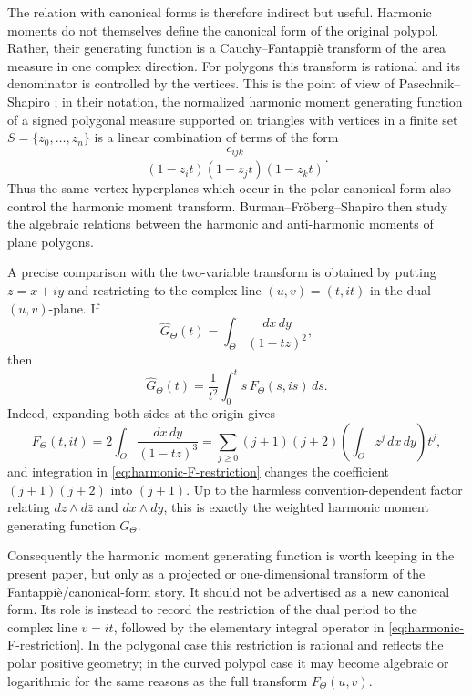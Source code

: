 \documentclass[10pt,a4paper,reqno]{amsart}
\theoremstyle{plain}
\theoremstyle{definition}
\begin{document}
The relation with canonical forms is therefore indirect but useful.  Harmonic
moments do not themselves define the canonical form of the original polypol.
Rather, their generating function is a Cauchy--Fantappi\`e transform of the area
measure in one complex direction.  For polygons this transform is rational and
its denominator is controlled by the vertices.  This is the point of view of
Pasechnik--Shapiro \cite{PaSh}; in their notation, the normalized harmonic
moment generating function of a signed polygonal measure supported on triangles
with vertices in a finite set $S=\{z_0,\ldots,z_n\}$ is a linear combination of
terms of the form
\[
        \frac{c_{ijk}}{(1-z_i t)(1-z_jt)(1-z_kt)}.
\]
Thus the same vertex hyperplanes which occur in the polar canonical form also
control the harmonic moment transform.  Burman--Fr\"oberg--Shapiro
\cite{BuFrSh} then study the algebraic relations between the harmonic and
anti-harmonic moments of plane polygons.

A precise comparison with the two-variable transform is obtained by putting
$z=x+iy$ and restricting to the complex line $(u,v)=(t,it)$ in the dual
$(u,v)$-plane.  If
\[
        \widehat G_\Theta(t)=\int_\Theta\frac{dx\,dy}{(1-tz)^2},
\]
then
\begin{equation}\label{eq:harmonic-F-restriction}
        \widehat G_\Theta(t)=
        \frac{1}{t^2}\int_0^t s\,F_\Theta(s,is)\,ds .
\end{equation}
Indeed, expanding both sides at the origin gives
\[
        F_\Theta(t,it)
        =2\int_\Theta\frac{dx\,dy}{(1-tz)^3}
        =\sum_{j\geq0}(j+1)(j+2)
          \left(\int_\Theta z^j\,dx\,dy\right)t^j,
\]
and integration in \eqref{eq:harmonic-F-restriction} changes the coefficient
$(j+1)(j+2)$ into $(j+1)$.  Up to the harmless convention-dependent factor
relating $dz\wedge d\bar z$ and $dx\wedge dy$, this is exactly the weighted
harmonic moment generating function $G_\Theta$.

Consequently the harmonic moment generating function is worth keeping in the
present paper, but only as a projected or one-dimensional transform of the
Fantappi\`e/canonical-form story.  It should not be advertised as a new
canonical form.  Its role is instead to record the restriction of the dual
period to the complex line $v=it$, followed by the elementary integral operator
in \eqref{eq:harmonic-F-restriction}.  In the polygonal case this restriction
is rational and reflects the polar positive geometry; in the curved polypol
case it may become algebraic or logarithmic for the same reasons as the full
transform $F_\Theta(u,v)$.
\end{document}
